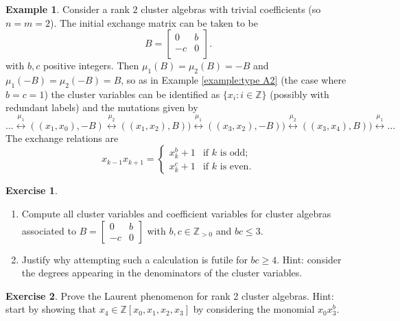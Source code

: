\documentclass{amsart}
\theoremstyle{definition}
\newtheorem{example}[theorem]{Example}
\newtheorem{subexercise}{Exercise}[theorem]
\theoremstyle{remark}
\numberwithin{equation}{section}
\newcommand{\ZZ}{{\mathbb{Z}}}
\begin{document}
	\begin{example} \label{example:rank2}
		Consider a rank $2$ cluster algebras with trivial coefficients (so $n=m=2$).  The initial exchange matrix can be taken to be
		\begin{displaymath}
			B = \left[ \begin{array}{cc} 	0 & b \\	-c & 0 \\	\end{array}	\right].
		\end{displaymath}
		with $b,c$ positive integers.  Then $\mu_1(B) = \mu_2(B) = -B$ and $\mu_1(-B) = \mu_2(-B) = B$, so as in Example \ref{example:type A2} (the case where $b=c=1$) the cluster variables can be identified as $\{x_i : i \in \mathbb{Z}\}$ (possibly with redundant labels) and the mutations given by 
		\begin{displaymath}
		\ldots \stackrel{\mu_1}{\longleftrightarrow} ((x_1,x_0),-B) \stackrel{\mu_2}{\longleftrightarrow} ((x_1,x_2),B)) \stackrel{\mu_1}{\longleftrightarrow} ((x_3,x_2),-B)) \stackrel{\mu_2}{\longleftrightarrow} ((x_3,x_4),B)) \stackrel{\mu_1}{\longleftrightarrow} \ldots
		\end{displaymath}
		The exchange relations are
		\begin{displaymath}
		x_{k-1}x_{k+1}=\begin{cases}x_k^b+1 & \text{if $k$ is odd;}\\ x_k^c+1 & \text{if $k$ is even.}\end{cases}
		\end{displaymath}
		
		\begin{subexercise}\label{exercise:rank 2}\mbox{}
            \begin{enumerate}
                \item Compute all cluster variables and coefficient variables for cluster algebras associated to $B=\left[\begin{array}{cc} 0 & b\\ -c & 0\end{array}\right]$ with $b,c\in\ZZ_{>0}$ and $bc\le 3$.
                \item Justify why attempting such a calculation is futile for $bc\ge4$.  Hint: consider the degrees appearing in the denominators of the cluster variables.
    		\end{enumerate}
  		\end{subexercise}
	
		\begin{subexercise}\label{exercise:rank 2 Laurent phenomenon}
    		Prove the Laurent phenomenon for rank 2 cluster algebras.  Hint: start by showing that $x_4\in\ZZ[x_0,x_1,x_2,x_3]$ by considering the monomial $x_0x_3^b$.
  		\end{subexercise}
	\end{example}
	
\end{document}
